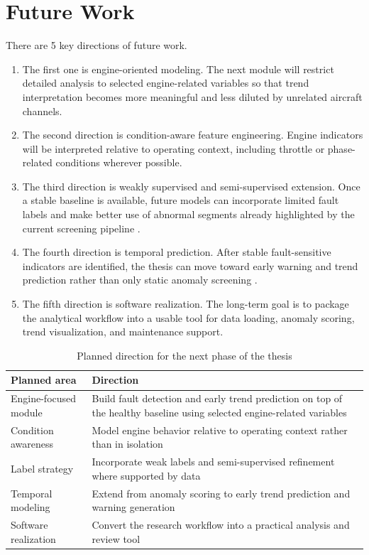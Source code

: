 \documentclass[12pt,a4paper]{report}
\begin{document}
	\section{Future Work}
	
	There are 5 key directions of future work.
	
	\begin{enumerate}
		\item The first one is engine-oriented modeling. The next module will restrict detailed analysis to selected engine-related variables so that trend interpretation becomes more meaningful and less diluted by unrelated aircraft channels.
		\item The second direction is condition-aware feature engineering. Engine indicators will be interpreted relative to operating context, including throttle or phase-related conditions wherever possible.
		\item The third direction is weakly supervised and semi-supervised extension. Once a stable baseline is available, future models can incorporate limited fault labels and make better use of abnormal segments already highlighted by the current screening pipeline \cite{memarzadeh2022resad,memarzadeh2022multiclass}.
		\item The fourth direction is temporal prediction. After stable fault-sensitive indicators are identified, the thesis can move toward early warning and trend prediction rather than only static anomaly screening \cite{si2011rul,gao2023lstm}.
		\item The fifth direction is software realization. The long-term goal is to package the analytical workflow into a usable tool for data loading, anomaly scoring, trend visualization, and maintenance support.
	\end{enumerate}
	
	\begin{table}[htbp]
		\centering
		\caption{Planned direction for the next phase of the thesis}
		\label{tab:future-work}
		\small
		\begin{tabular}{|p{3.4cm}|p{9.7cm}|}
			\hline
			\textbf{Planned area} & \textbf{Direction} \\
			\hline
			Engine-focused module & Build fault detection and early trend prediction on top of the healthy baseline using selected engine-related variables \\
			\hline
			Condition awareness & Model engine behavior relative to operating context rather than in isolation \\
			\hline
			Label strategy & Incorporate weak labels and semi-supervised refinement where supported by data \\
			\hline
			Temporal modeling & Extend from anomaly scoring to early trend prediction and warning generation \\
			\hline
			Software realization & Convert the research workflow into a practical analysis and review tool \\
			\hline
		\end{tabular}
	\end{table}
	
\end{document}
